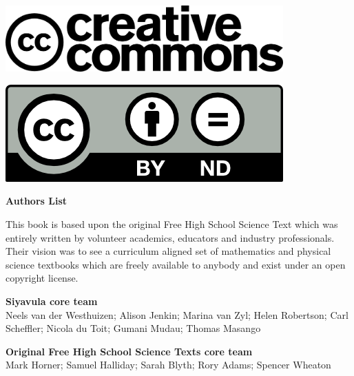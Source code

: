 \vspace*{4in}

\begin{center}
\begin{minipage}{0.6\textwidth}
\includegraphics[width=0.8\textwidth]{../title_images/cc2.png}
\end{minipage}
\begin{minipage}{0.3\textwidth}
\includegraphics[width=0.8\textwidth]{../title_images/cc1.png}
\end{minipage}
\end{center}

\newpage
\thispagestyle{empty}


\begin{flushleft} \textbf{\huge Authors List} \end{flushleft}

{\LARGE This book is based upon the original Free High School Science Text which was entirely written by
volunteer academics, educators and industry professionals. Their vision was to see a curriculum aligned
set of mathematics and physical science textbooks which are freely available to anybody and exist
under an open copyright license.} \par

\textbf{\LARGE Siyavula core team} \\

Neels van der Westhuizen; Alison Jenkin; Marina van Zyl; Helen Robertson; Carl Scheffler; Nicola du Toit; Gumani Mudau; Thomas Masango \par

\textbf{\LARGE Original Free High School Science Texts core team}\\

Mark Horner; Samuel Halliday; Sarah Blyth; Rory Adams; Spencer Wheaton \par 


